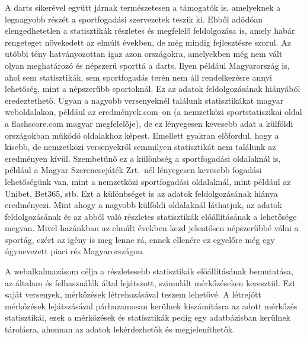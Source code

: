 A darts sikerével együtt járnak természetesen a támogatók is, amelyeknek a legnagyobb részét a sportfogadási szervezetek teszik ki. Ebből adódóan elengedhetetlen a statisztikák részletes és megfelelő feldolgozása is, amely habár rengeteget növekedett az elmúlt években, de még mindig fejlesztésre szorul. Az utóbbi tény hatványozottan igaz azon országokra, amelyekben még nem vált olyan meghatározó és népszerű sporttá a darts. Ilyen például Magyarország is, ahol sem statisztikák, sem sportfogadás terén nem áll rendelkezésre annyi lehetőség, mint a népszerűbb sportoknál. Ez az adatok feldolgozásának hiányából eredeztethető. Ugyan a nagyobb versenyeknél találunk statisztikákat magyar weboldalakon, például az eredmények.com–on (a nemzetközi sportstatiszikai oldal a flashscore.com magyar megfelelője), de ez lényegesen kevesebb adat a külföldi országokban működő oldalakhoz képest. Emellett gyakran előfordul, hogy a kisebb, de nemzetközi versenyekről semmilyen statisztikát nem találunk az eredményen kívül. Szembetűnő ez a különbség a sportfogadási oldalaknál is, például a Magyar Szerencsejáték Zrt.–nél lényegesen kevesebb fogadási lehetőségünk van, mint a nemzetközi sportfogadási oldalaknál, mint például az Unibet, Bet365, stb. Ezt a különbséget is az adatok feldolgozásának hiánya eredményezi. Mint ahogy a nagyobb külföldi oldalaknál láthatjuk, az adatok feldolgozásának és az abból való részletes statisztikák előállításának a lehetősége megvan. Mivel hazánkban az elmúlt években kezd jelentősen népszerűbbé válni a sportág, ezért az igény is meg lenne rá, ennek ellenére ez egyelőre még egy úgynevezett piaci rés Magyarországon.

A webalkalmazásom célja a részletesebb statisztikák előállításának bemutatása, az általam és felhasználók által lejátszott, szimulált mérkőzéseken keresztül. Ezt saját versenyek, mérkőzések létrehozásával teszem lehetővé. A létrejött mérkőzések lejátszásával párhuzamosan kerülnek kiszámításra az adott mérkőzés statisztikái, ezek a mérkőzések és statisztikák pedig egy adatbázisban kerülnek tárolásra, ahonnan az adatok lekérdezhetők és megjeleníthetők.
